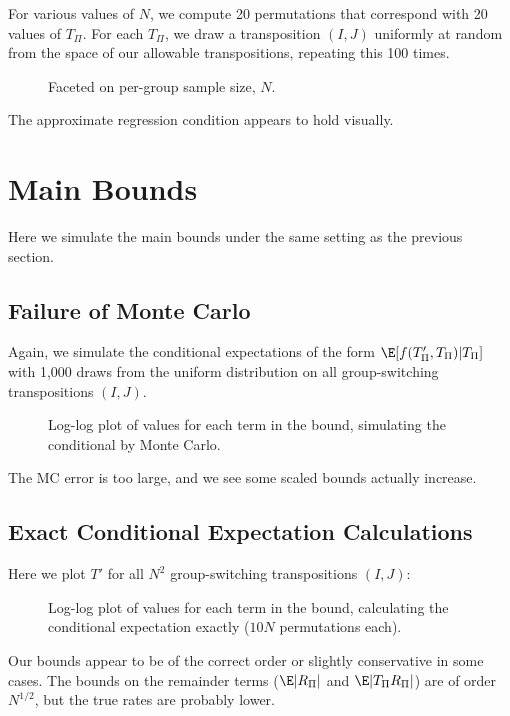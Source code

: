 For various values of $N$, we compute 20 permutations that correspond with 20 values of $T_{\Pi}$.
For each $T_{\Pi}$, we draw a transposition $(I, J)$ uniformly at random from the space of our
allowable transpositions, repeating this 100 times.
\begin{figure}[!ht]
  \centering
  \resizebox{12.0cm}{!}{}
  \caption{Faceted on per-group sample size, $N$.}
\end{figure}

The approximate regression condition appears to hold visually.
\clearpage

\section{Main Bounds}
Here we simulate the main bounds under the same setting as the previous section.
\subsection{Failure of Monte Carlo}
Again, we simulate the conditional expectations of the form $\E[f(T'_{\Pi}, T_{\Pi}) | T_{\Pi}]$
with 1,000 draws from the uniform distribution on all group-switching transpositions $(I, J)$.

\begin{figure}[!ht]
  \centering
  
  \caption{Log-log plot of values for each term in the bound,
    simulating the conditional by Monte Carlo.}
\end{figure}
The MC error is too large, and we see some scaled bounds actually increase.
\clearpage

\subsection{Exact Conditional Expectation Calculations}
Here we plot $T'$ for all $N^2$ group-switching transpositions $(I, J)$:
\begin{figure}[!ht]
  \centering
  
  \caption{Log-log plot of values for each term in the bound, calculating the conditional
    expectation exactly ($10N$ permutations each).}
\end{figure}

Our bounds appear to be of the correct order or slightly conservative in some cases.  The bounds on
the remainder terms ($\E |R_{\Pi}|$ and $\E |T_{\Pi}R_{\Pi}|$) are of order $N^{1/2}$, but the true
rates are probably lower.
\clearpage


